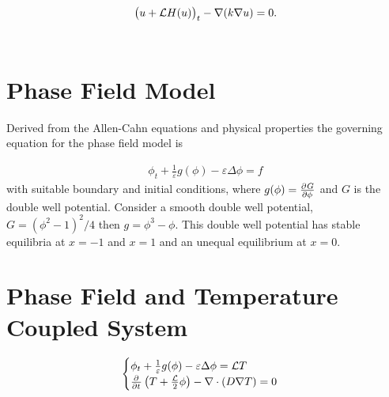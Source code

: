 \begin{eqnarray}
\big(u+ \mathcal{L} H(u)\big)_t - {\nabla} (k {\nabla} u) = 0.
\end{eqnarray}\\
\vspace{2mm} 


\section{Phase Field Model}

Derived from the Allen-Cahn equations and physical properties the governing equation for the phase field model is 

\begin{eqnarray}
\phi_t + \frac{1}{\varepsilon}g(\phi) - \varepsilon \Delta \phi =f
\end{eqnarray}
with suitable boundary and initial conditions, where $g(\phi) = \frac{\partial^{} G}{\partial {\phi}^{}}$ and $G$ is the double well potential. Consider a smooth double well potential, $G= (\phi^2-1)^2/4$ then $g = \phi^3 -\phi$. This double well potential has stable equilibria at $x=-1$ and $x=1$ and an unequal equilibrium at $x=0$.


\section{Phase Field and Temperature Coupled System}

\begin{eqnarray}
\begin{cases}
\phi_t + \frac{1}{\varepsilon}g(\phi) - \varepsilon \Delta \phi =\mathcal{L} T\\
\frac{\partial^{} }{\partial {t}^{}}\left(T+\frac{\mathcal{L}}{2} \phi \right) - {\nabla} \cdot (D {\nabla} T) = 0
\end{cases}
\end{eqnarray}

                                     